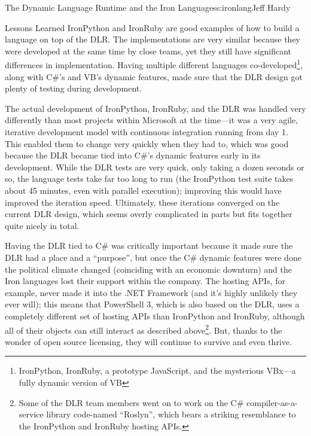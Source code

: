 \begin{aosachapter}{The Dynamic Language Runtime and the Iron Languages}{s:ironlang}{Jeff Hardy}
\begin{aosasect1}{Lessons Learned}
IronPython and IronRuby are good examples of how to build a language on top of
the DLR. The implementations are very similar because they were developed at
the same time by close teams, yet they still have significant differences in
implementation. Having multiple different languages
co-developed\footnote{IronPython, IronRuby, a prototype JavaScript, and the
mysterious VBx---a fully dynamic version of VB}, along with C\#'s and VB's
dynamic features, made sure that the DLR design got plenty of testing during
development.

The actual development of IronPython, IronRuby, and the DLR was handled very
differently than most projects within Microsoft at the time---it was a very
agile, iterative development model with continuous integration running from day
1. This enabled them to change very quickly when they had to, which was good
because the DLR became tied into C\#'s dynamic features early in its
development. While the DLR tests are very quick, only taking a dozen seconds or
so, the language tests take far too long to run (the IronPython test suite
takes about 45 minutes, even with parallel execution); improving this would
have improved the iteration speed. Ultimately, these iterations converged on
the current DLR design, which seems overly complicated in parts but fits
together quite nicely in total.

Having the DLR tied to C\# was critically important because it made sure the
DLR had a place and a ``purpose'', but once the C\# dynamic features were done
the political climate changed (coinciding with an economic downturn) and the
Iron languages lost their support within the company. The hosting APIs, for
example, never made it into the .NET Framework (and it's highly unlikely they
ever will); this means that PowerShell 3, which is also based on the DLR, uses
a completely different set of hosting APIs than IronPython and IronRuby,
although all of their objects can still interact as described
above\footnote{Some of the DLR team members went on to work on the C\#
compiler-as-a-service library code-named ``Roslyn'', which bears a striking
resemblance to the IronPython and IronRuby hosting APIs.}. But, thanks to the
wonder of open source licensing, they will continue to survive and even thrive.

\end{aosasect1}

\end{aosachapter}
